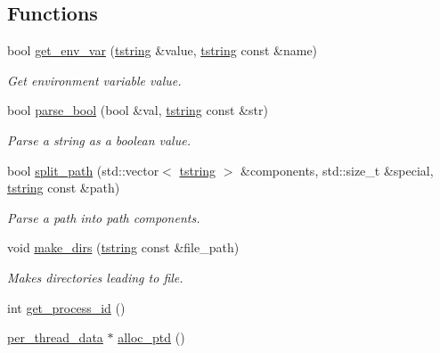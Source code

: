 \subsection*{Functions}
\begin{DoxyCompactItemize}
\item 
bool \hyperlink{namespacelog4cplus_1_1internal_ae6c2e84b050b97dd3d3f0a67786527d2}{get\-\_\-env\-\_\-var} (\hyperlink{namespacelog4cplus_a3c9287f6ebcddc50355e29d71152117b}{tstring} \&value, \hyperlink{namespacelog4cplus_a3c9287f6ebcddc50355e29d71152117b}{tstring} const \&name)
\begin{DoxyCompactList}\small\item\em Get environment variable value. \end{DoxyCompactList}\item 
bool \hyperlink{namespacelog4cplus_1_1internal_a4a4d467437ef06944054d90782c64d49}{parse\-\_\-bool} (bool \&val, \hyperlink{namespacelog4cplus_a3c9287f6ebcddc50355e29d71152117b}{tstring} const \&str)
\begin{DoxyCompactList}\small\item\em Parse a string as a boolean value. \end{DoxyCompactList}\item 
bool \hyperlink{namespacelog4cplus_1_1internal_a2ee1b1e23169f21d351eb61c21ae921e}{split\-\_\-path} (std\-::vector$<$ \hyperlink{namespacelog4cplus_a3c9287f6ebcddc50355e29d71152117b}{tstring} $>$ \&components, std\-::size\-\_\-t \&special, \hyperlink{namespacelog4cplus_a3c9287f6ebcddc50355e29d71152117b}{tstring} const \&path)
\begin{DoxyCompactList}\small\item\em Parse a path into path components. \end{DoxyCompactList}\item 
void \hyperlink{namespacelog4cplus_1_1internal_ac96083670741d7a5d7616541ed411bcf}{make\-\_\-dirs} (\hyperlink{namespacelog4cplus_a3c9287f6ebcddc50355e29d71152117b}{tstring} const \&file\-\_\-path)
\begin{DoxyCompactList}\small\item\em Makes directories leading to file. \end{DoxyCompactList}\item 
int \hyperlink{namespacelog4cplus_1_1internal_af20dce5c523d8ff3b781d650d672e0c3}{get\-\_\-process\-\_\-id} ()
\item 
\hyperlink{structlog4cplus_1_1internal_1_1per__thread__data}{per\-\_\-thread\-\_\-data} $\ast$ \hyperlink{namespacelog4cplus_1_1internal_a2d1cd90470884dca90cfb2eddadc69b2}{alloc\-\_\-ptd} ()

\end{DoxyCompactItemize}
